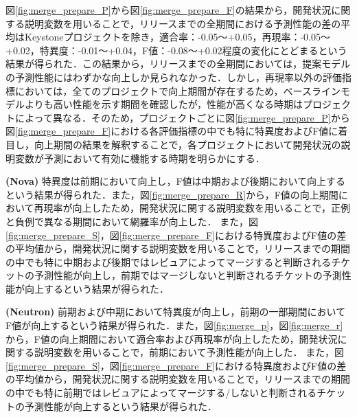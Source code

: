 \documentclass[submit]{ipsj}
\begin{document}
図\ref{fig:merge_prepare_P}から図\ref{fig:merge_prepare_F}の結果から，開発状況に関する説明変数を用いることで，リリースまでの全期間における予測性能の差の平均はKeystoneプロジェクトを除き，適合率：-0.05〜+0.05，再現率：-0.05〜+0.02，特異度：-0.01〜+0.04，F値：-0.08〜+0.02程度の変化にとどまるという結果が得られた．この結果から，リリースまでの全期間においては，提案モデルの予測性能にはわずかな向上しか見られなかった．しかし，再現率以外の評価指標においては，全てのプロジェクトで向上期間が存在するため，ベースラインモデルよりも高い性能を示す期間を確認したが，性能が高くなる時期はプロジェクトによって異なる．そのため，プロジェクトごとに図\ref{fig:merge_prepare_P}から図\ref{fig:merge_prepare_F}における各評価指標の中でも特に特異度およびF値に着目し，向上期間の結果を解釈することで，各プロジェクトにおいて開発状況の説明変数が予測において有効に機能する時期を明らかにする．

\textbf{ (Nova) }特異度は前期において向上し，F値は中期および後期において向上するという結果が得られた．また，図\ref{fig:merge_prepare_R}から，F値の向上期間において再現率が向上したため，開発状況に関する説明変数を用いることで，正例と負例で異なる期間において網羅率が向上した．
また，図\ref{fig:merge_prepare_S}，図\ref{fig:merge_prepare_F}における特異度およびF値の差の平均値から，開発状況に関する説明変数を用いることで，リリースまでの期間の中でも特に中期および後期ではレビュアによってマージすると判断されるチケットの予測性能が向上し，前期ではマージしないと判断されるチケットの予測性能が向上するという結果が得られた．

\textbf{ (Neutron) }前期および中期において特異度が向上し，前期の一部期間においてF値が向上するという結果が得られた．また，図\ref{fig:merge_p}，図\ref{fig:merge_r}から，F値の向上期間において適合率および再現率が向上したため，開発状況に関する説明変数を用いることで，前期において予測性能が向上した．
また，図\ref{fig:merge_prepare_S}，図\ref{fig:merge_prepare_F}における特異度およびF値の差の平均値から，開発状況に関する説明変数を用いることで，リリースまでの期間の中でも特に前期ではレビュアによってマージする/しないと判断されるチケットの予測性能が向上するという結果が得られた．
\end{document}
